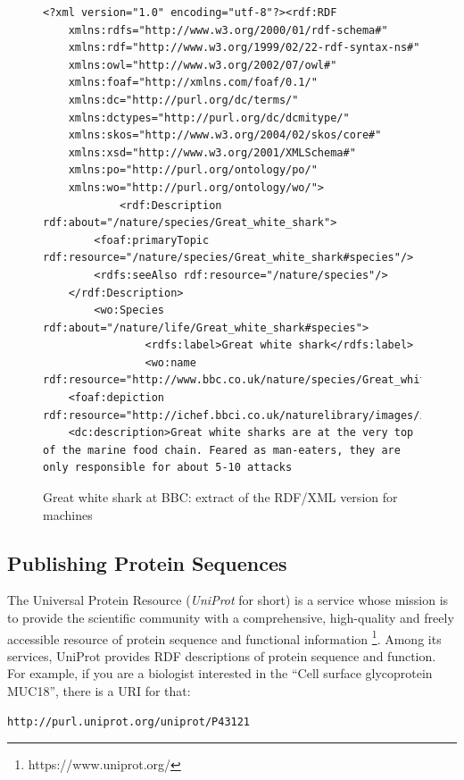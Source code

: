 \begin{figure}
\begin{lstlisting}
<?xml version="1.0" encoding="utf-8"?><rdf:RDF
    xmlns:rdfs="http://www.w3.org/2000/01/rdf-schema#" 
    xmlns:rdf="http://www.w3.org/1999/02/22-rdf-syntax-ns#" 
    xmlns:owl="http://www.w3.org/2002/07/owl#" 
    xmlns:foaf="http://xmlns.com/foaf/0.1/" 
    xmlns:dc="http://purl.org/dc/terms/" 
    xmlns:dctypes="http://purl.org/dc/dcmitype/" 
    xmlns:skos="http://www.w3.org/2004/02/skos/core#"
    xmlns:xsd="http://www.w3.org/2001/XMLSchema#" 
    xmlns:po="http://purl.org/ontology/po/" 
    xmlns:wo="http://purl.org/ontology/wo/">
    		<rdf:Description rdf:about="/nature/species/Great_white_shark">
		<foaf:primaryTopic rdf:resource="/nature/species/Great_white_shark#species"/>
		<rdfs:seeAlso rdf:resource="/nature/species"/>
	</rdf:Description>
		<wo:Species rdf:about="/nature/life/Great_white_shark#species">
				<rdfs:label>Great white shark</rdfs:label>
				<wo:name rdf:resource="http://www.bbc.co.uk/nature/species/Great_white_shark#name"/>
	<foaf:depiction rdf:resource="http://ichef.bbci.co.uk/naturelibrary/images/ic/640x360/g/gr/great_white_shark/great_white_shark_1.jpg"/>
	<dc:description>Great white sharks are at the very top of the marine food chain. Feared as man-eaters, they are only responsible for about 5-10 attacks
\end{lstlisting}
    \caption{Great white shark at BBC: extract of the RDF/XML version for
machines}
    \label{fig:ch5.4}
\end{figure}


\subsection{Publishing Protein Sequences}

The Universal Protein Resource (\emph{UniProt} for short) is a service whose mission is to 
provide the scientific community 
with a comprehensive, high-quality and freely accessible resource of protein sequence and 
functional information \footnote{https://www.uniprot.org/}. 
Among its services, UniProt  provides RDF descriptions of protein sequence and
function. For example, if you are a biologist interested in the ``Cell surface
glycoprotein MUC18'', there is a URI for that:

\begin{lstlisting}
http://purl.uniprot.org/uniprot/P43121
\end{lstlisting}


